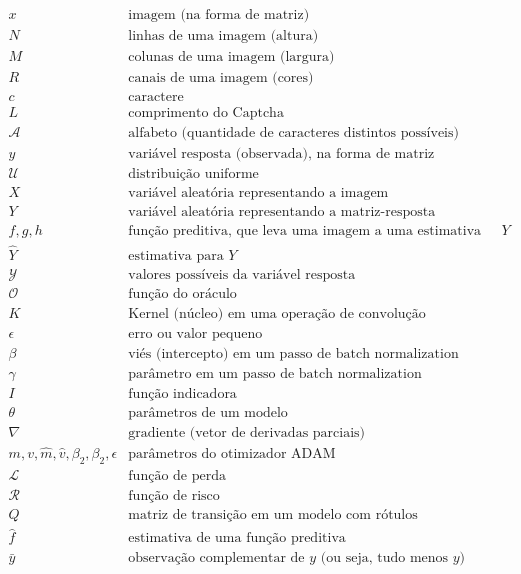 \documentclass[12pt,twoside,brazilian]{book}
\begin{document}
\begin{displaymath}
\begin{array}{ll}
   x & \text{imagem (na forma de matriz)}\\
   N & \text{linhas de uma imagem (altura)}\\
   M & \text{colunas de uma imagem (largura)}\\
   R & \text{canais de uma imagem (cores)}\\
   c & \text{caractere}\\
   L & \text{comprimento do Captcha}\\
   \mathcal A & \text{alfabeto (quantidade de caracteres distintos possíveis)}\\
   y & \text{variável resposta (observada), na forma de matriz}\\
   \mathcal U & \text{distribuição uniforme}\\
   X & \text{variável aleatória representando a imagem}\\
   Y & \text{variável aleatória representando a matriz-resposta}\\
   f, g, h & \text{função preditiva, que leva uma imagem a uma estimativa para } Y\\
   \hat Y & \text{estimativa para } Y\\
   \mathcal Y & \text{valores possíveis da variável resposta}\\
   \mathcal O & \text{função do oráculo}\\
   K & \text{Kernel (núcleo) em uma operação de convolução}\\
   \epsilon & \text{erro ou valor pequeno}\\
   \beta & \text{viés (intercepto) em um passo de batch normalization}\\
   \gamma & \text{parâmetro em um passo de batch normalization}\\
   I & \text{função indicadora}\\
   \theta & \text{parâmetros de um modelo}\\
   \nabla & \text{gradiente (vetor de derivadas parciais)}\\
   m,v,\hat m, \hat v, \beta_2, \beta_2, \epsilon & \text{parâmetros do otimizador ADAM}\\
   \mathcal L & \text{função de perda}\\
   \mathcal R & \text{função de risco}\\
   Q & \text{matriz de transição em um modelo com rótulos complementares}\\
   \hat f & \text{estimativa de uma função preditiva}\\
   \bar y & \text{observação complementar de } y \text{ (ou seja, tudo menos } y \text{)}
\end{array}
\end{displaymath}
\end{document}
